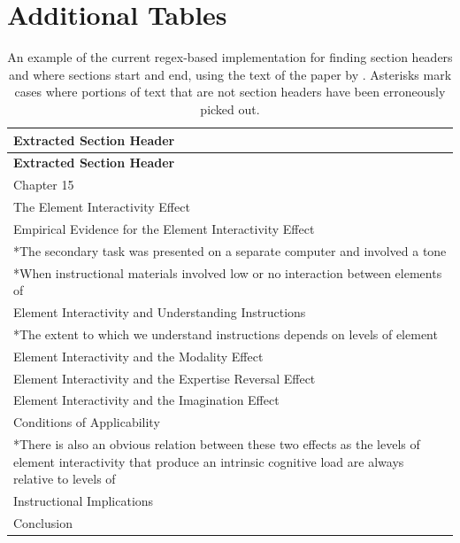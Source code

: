 \documentclass[12pt]{article}
\theoremstyle{grammarstyle}
\begin{document}
\section{Additional Tables}
\begin{longtable}{|p{13cm}|}
    \caption{An example of the current regex-based implementation for finding section headers and where sections start and end, using the text of the paper by \cite{sweller2011element}. Asterisks mark cases where portions of text that are not section headers have been erroneously picked out.}
    \label{tab:section_finding_example} \\
    \hline
    \textbf{Extracted Section Header} \\
    \hline
    \endfirsthead

    \hline
    \textbf{Extracted Section Header} \\
    \hline
    \endhead

    Chapter 15 \\
    The Element Interactivity Effect \\
    \hline
    Empirical Evidence for the Element Interactivity Effect \\ \hline
    *The secondary task was presented on a separate computer and involved a tone \\
    \hline
    *When instructional materials involved low or no interaction between elements of \\
    \hline
    Element Interactivity and Understanding Instructions \\
    \hline
    *The extent to which we understand instructions depends on levels of element \\
    \hline
    Element Interactivity and the Modality Effect \\
    \hline
    Element Interactivity and the Expertise Reversal Effect \\
    \hline
    Element Interactivity and the Imagination Effect \\
    \hline
    Conditions of Applicability \\
    \hline
    *There is also an obvious relation between these two effects as the levels of element
    interactivity that produce an intrinsic cognitive load are always relative to levels of \\
    \hline
    Instructional Implications \\
    \hline
    Conclusion \\
    \hline
\end{longtable}
\end{document}
